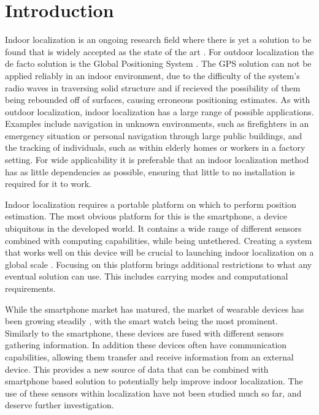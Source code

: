 
\chapter{Introduction} \label{chap:intro}

Indoor localization is an ongoing research field where there is yet a solution to be found that is widely accepted as the state of the art \cite{Davidson2017}. For outdoor localization the de facto solution is the Global Positioning System \cite{Jackermeier2018}. The GPS solution can not be applied reliably in an indoor environment, due to the difficulty of the system's radio waves in traversing solid structure and if recieved the possibility of them being rebounded off of surfaces, causing erroneous positioning estimates. As with outdoor localization, indoor localization has a large range of possible applications. Examples include navigation in unknown environments, such as firefighters in an emergency situation or personal navigation through large public buildings, and the tracking of individuals, such as within elderly homes or workers in a factory setting. For wide applicability it is preferable that an indoor localization method has as little dependencies as possible, ensuring that little to no installation is required for it to work. \par 
Indoor localization requires a portable platform on which to perform position estimation. The most obvious platform for this is the smartphone, a device ubiquitous in the developed world. It contains a wide range of different sensors combined with computing capabilities, while being untethered. Creating a system that works well on this device will be crucial to launching indoor localization on a global scale \cite{Gu2019}. Focusing on this platform brings additional restrictions to what any eventual solution can use. This includes carrying modes and computational requirements. \par 
While the smartphone market has matured, the market of wearable devices has been growing steadily \cite{jung2016consumer}, with the smart watch being the most prominent. Similarly to the smartphone, these devices are fused with different sensors gathering information. In addition these devices often have communication capabilities, allowing them transfer and receive information from an external device. This provides a new source of data that can be combined with smartphone based solution to potentially help improve indoor localization. The use of these sensors within localization have not been studied much so far, and deserve further investigation.



